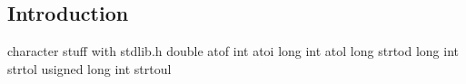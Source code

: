 
\subsection{Introduction}

character stuff with stdlib.h
double atof
int atoi
long int atol
long strtod
long int strtol
usigned long int strtoul
